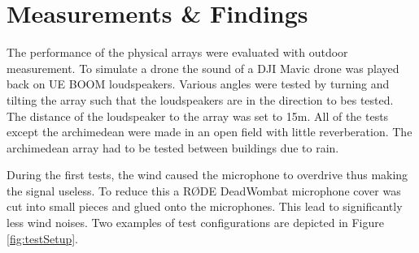 \section{Measurements \& Findings} \label{sec:array_prototype_measurements}
The performance of the physical arrays were evaluated with outdoor measurement.
To simulate a drone the sound of a DJI Mavic drone was played back on 
UE BOOM loudspeakers.
Various angles were tested by turning and tilting the array such that 
the loudspeakers are in the direction to bes tested.
The distance of the loudspeaker to the array was set to 
15m.
All of the tests except the archimedean were made in an open field with little reverberation.
The archimedean array had to be tested between buildings due to rain.

During the first tests, the wind caused the microphone to overdrive
thus making the signal useless.
To reduce this a RØDE DeadWombat microphone cover was cut into small pieces
and glued onto the microphones.
This lead to significantly less wind noises.
Two examples of test configurations are depicted in Figure \ref*{fig:testSetup}.

